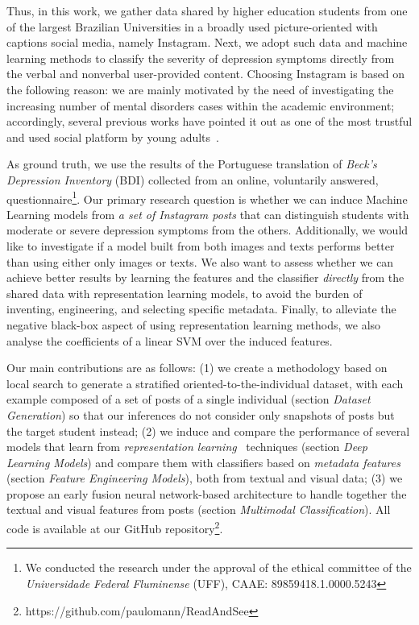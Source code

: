 \documentclass[letterpaper]{article} \usepackage{aaai20}  \usepackage{times}  \usepackage{helvet} \usepackage{courier}  \usepackage[hyphens]{url}  \usepackage{graphicx} \urlstyle{rm} \def\UrlFont{\rm}  \usepackage{graphicx}  \frenchspacing  \setlength{\pdfpagewidth}{8.5in}  \setlength{\pdfpageheight}{11in}  \usepackage[final]{changes}
\begin{document}
Thus, in this work, we gather data shared by higher education students from one of the largest Brazilian Universities in a broadly used picture-oriented with captions social media, namely Instagram. Next, we adopt such data and machine learning methods to classify the severity of depression symptoms directly from the verbal and nonverbal user-provided content.  Choosing Instagram is based on the following reason: we are mainly motivated by the need of investigating the increasing number of mental disorders cases within the academic environment; accordingly, several previous works have pointed it out as one of the most trustful and used social platform by young adults~\cite{shane2018college,huang2018motives}. 

As ground truth, we use the results of the Portuguese translation of \textit{Beck's Depression Inventory} (BDI) collected from an online, voluntarily answered, questionnaire{\footnote{We conducted the research under the approval of the ethical committee of the \textit{Universidade Federal Fluminense} (UFF), CAAE: 89859418.1.0000.5243}}. Our primary research question is whether we can induce Machine Learning models from \emph{a set of Instagram posts} that can distinguish students with moderate or severe depression symptoms from the others. Additionally, we would like to investigate if a model built from both images and texts performs better than using either only images or texts. We also want to assess whether we can achieve better results by learning the features and the classifier \emph{directly} from the shared data with representation learning models, to avoid the burden of inventing, engineering, and selecting specific metadata. Finally, to alleviate the negative black-box aspect of using representation learning methods, we also analyse the coefficients of a linear SVM over the induced features.







Our main contributions are as follows: (1) we create a methodology based on local search to generate a stratified oriented-to-the-individual dataset, with each example composed of a set of posts of a single individual (section {\textsl{Dataset Generation}}) so that our inferences do not consider only snapshots of posts but the target student instead; (2) we induce and compare the performance of several models that learn from \emph{representation learning}~\cite{lecun2015deep} techniques (section {\textsl{Deep Learning Models}}) and compare them with classifiers based on \emph{metadata features} (section {\textsl{Feature Engineering Models}}), both from textual and visual data; (3) we propose an early fusion neural network-based architecture to handle together the textual and visual features from posts (section {\textsl{Multimodal Classification}}). All code is available at our GitHub repository\footnote{https://github.com/paulomann/ReadAndSee}.
\end{document}
